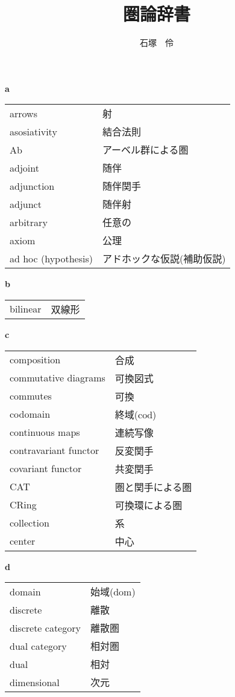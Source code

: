 \documentclass[dvipdfmx]{jsarticle}
\title{圏論辞書}
\author{石塚　伶}
\date{}
\begin{document}
\maketitle

\textbf{a}

  \begin{tabular}{ll}
    arrows & 射 \\
    asosiativity & 結合法則 \\
    Ab & アーベル群による圏 \\
    adjoint & 随伴 \\
    adjunction & 随伴関手 \\
    adjunct & 随伴射 \\
    arbitrary & 任意の \\
    axiom & 公理 \\
    ad hoc (hypothesis) & アドホックな仮説(補助仮説) \\
  \end{tabular}

\textbf{b}

  \begin{tabular}{ll}
    bilinear & 双線形 \\
  \end{tabular}

\textbf{c}

  \begin{tabular}{ll}
    composition & 合成 \\
    commutative diagrams & 可換図式 \\
    commutes & 可換 \\
    codomain & 終域($\mathrm{cod}$) \\
    continuous maps & 連続写像 \\
    contravariant functor & 反変関手 \\
    covariant functor & 共変関手 \\
    CAT & 圏と関手による圏 \\
    CRing & 可換環による圏 \\
    collection & 系 \\
    center & 中心
  \end{tabular}

\textbf{d}

  \begin{tabular}{ll}
    domain & 始域($\mathrm{dom}$) \\
    discrete & 離散 \\
    discrete category & 離散圏 \\
    dual category & 相対圏 \\
    dual & 相対 \\
    dimensional & 次元 \\
  \end{tabular}
\end{document}
